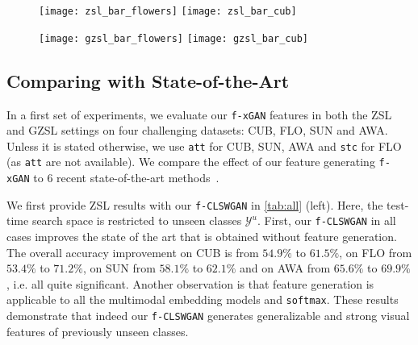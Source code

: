 \documentclass[10pt,twocolumn,letterpaper]{article}
\newcommand{\myparagraph}[1]{\vspace{6pt}\noindent{\bf #1}}
\def\mthd{\texttt{f-xGAN}\xspace}
\begin{document}
\begin{figure*}[t]
	\centering
    \begin{subfigure}[]{0.49\linewidth}
        \texttt{[image: zsl\_bar\_flowers]}
		\texttt{[image: zsl\_bar\_cub]}
        \label{fig:zsl_bar_zsl}
    \end{subfigure}
    \hfill
    \begin{subfigure}[]{0.49\linewidth}
            \texttt{[image: gzsl\_bar\_flowers]}
        \texttt{[image: gzsl\_bar\_cub]}
        \label{fig:zsl_bar_gzsl}
    \end{subfigure}
    \vspace{-3mm}
	\caption{Comparing \mthd versions with \texttt{f-GMMN} as well as comparing multimodal embedding methods with softmax.}
	\label{fig:zsl_bar}
\end{figure*}


\subsection{Comparing with State-of-the-Art}

In a first set of experiments, we evaluate our \mthd features in both the ZSL and GZSL settings on four challenging datasets: CUB, FLO, SUN and AWA.
Unless it is stated otherwise, we use \texttt{att} for CUB, SUN, AWA and \texttt{stc} for FLO (as \texttt{att} are not available).
We compare the effect of our feature generating \mthd to $6$ recent state-of-the-art methods~\cite{XSA17}.


\myparagraph{ZSL with \texttt{f-CLSWGAN}.}
We first provide ZSL results with our \texttt{f-CLSWGAN} in \autoref{tab:all} (left).
Here, the test-time search space is restricted to unseen classes $\mathcal{Y}^{u}$.
First, our \texttt{f-CLSWGAN} in all cases improves the state of the art that is obtained without feature generation.
The overall accuracy improvement on CUB is from $54.9\%$ to $61.5\%$, on FLO from $53.4\%$ 
to $71.2\%$, on SUN from $58.1\%$ to $62.1\%$ and on AWA from $65.6\%$ to $69.9\%$, i.e. all quite significant. Another observation is that feature generation is applicable to all the multimodal embedding models and \texttt{softmax}. These results demonstrate that indeed our \texttt{f-CLSWGAN} generates generalizable and strong visual features of previously unseen classes. 
\end{document}

